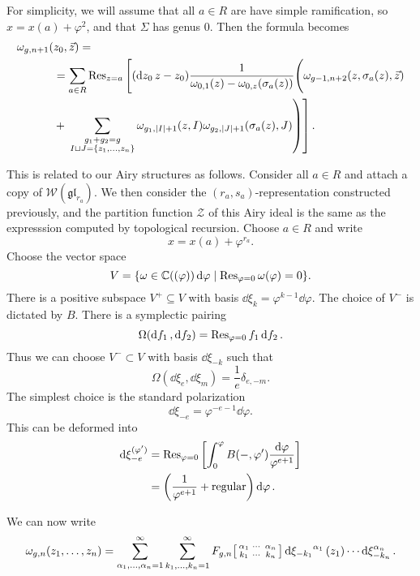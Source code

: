 \documentclass{amsart}
\theoremstyle{definition}
\theoremstyle{remark}
\theoremstyle{plain}
\theoremstyle{definition}
\theoremstyle{remark}
\newcommand{\C}{\mathbb{C}}
\newcommand{\mc}[1]{\mathcal{#1}}
\newcommand{\mf}[1]{\mathfrak{#1}}
\newcommand{\mr}[1]{\mathrm{#1}}
\newcommand{\1}{\mathbf{1}}
\newcommand{\2}{\mathbf{2}}
\newcommand{\3}{\mathbf{3}}
\begin{document}
For simplicity, we will assume that all $a \in R$ are have simple ramification, so $x = x(a) + \varphi^2$, and that $\Sigma$ has genus $0$. Then the formula becomes
\[
\begin{split}
    \omega_{g, n+1}(&z_0, \vec{z}) = \\
    &= \sum_{a \in R} \Res_{z = a}\Bigg[\qty(\dd{z_0}{z-z_0}) \frac{1}{\omega_{0,1}(z) - \omega_{0,z}(\sigma_a(z))} \Bigg(\omega_{g-1, n+2}(z, \sigma_a(z), \vec{z})  \\ 
    &+ \left. \left. \sum_{\substack{g_1+g_2=g \\ I \sqcup J = \qty{z_1,\ldots,z_n}}} \omega_{g_1, \abs{I}+1}(z, I) \omega_{g_2, \abs{J}+1}(\sigma_a(z), J)\right)\right].
\end{split}
\]

This is related to our Airy structures as follows. Consider all $a \in R$ and attach a copy of $\mc{W}(\mf{gl}_{r_a})$. We then consider the $(r_a, s_a)$-representation constructed previously, and the partition function $\mc{Z}$ of this Airy ideal is the same as the expresssion computed by topological recursion. Choose $a \in R$ and write
\[ x = x(a) + \varphi^{r_a}. \]
Choose the vector space
\[ V = \qty{\omega \in \C((\varphi)) \dd{\varphi} \mid \Res_{\varphi=0} \omega(\varphi) = 0}. \]
There is a positive subspace $V^+ \subseteq V$ with basis $\dd{\xi_k} = \varphi^{k-1} \dd{\varphi}$. The choice of $V^-$ is dictated by $B$. There is a symplectic pairing
\[ \Omega(\dd{f_1}, \dd{f_2}) = \Res_{\varphi = 0} f_1 \dd{f_2}. \]
Thus we can choose $V^- \subset V$ with basis $\dd{\xi_{-k}}$ such that
\[ \Omega(\dd{\xi_e}, \dd{\xi_m}) = \frac{1}{e} \delta_{e, -m}. \]
The simplest choice is the standard polarization
\[ \dd{\xi_{-e}} = \varphi^{-e-1} \dd{\varphi}. \]
This can be deformed into
\begin{align*}
    \dd{\xi_{-e}^{(\varphi')}} &= \Res_{\varphi=0} \qty[\int_0^{\varphi} B(-, \varphi') \frac{\dd{\varphi}}{\varphi^{e+1}}] \\
    &= \qty(\frac{1}{\varphi^{e+1}} + \mr{regular}) \dd{\varphi}.
\end{align*}

We can now write
\[ \omega_{g, n}(z_1, \ldots, z_n) = \sum_{\alpha_1, \ldots, \alpha_n=1}^{\infty} \sum_{k_1, \ldots, k_n = 1}^{\infty} F_{g,n}
\begin{bsmallmatrix}
    \alpha_1 & \cdots & \alpha_n \\
    k_1 & \cdots & k_n
\end{bsmallmatrix} \dd{\xi_{-k_1}}^{\alpha_1}(z_1) \cdots \dd{\xi_{-k_n}^{\alpha_n}}.
\]
\end{document}
